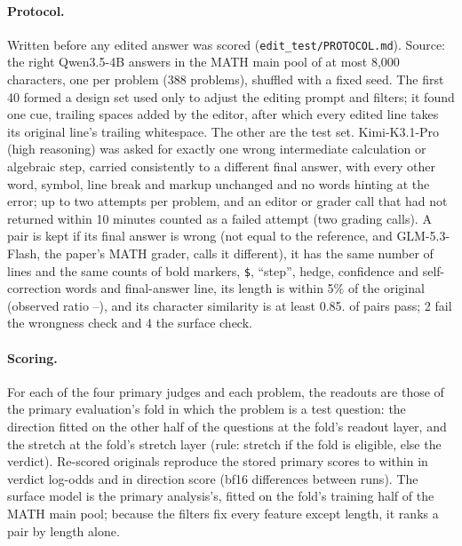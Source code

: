 \paragraph{Protocol.} Written before any edited answer was scored (\texttt{edit\_test/PROTOCOL.md}). Source: the right Qwen3.5-4B answers in the MATH main pool of at most 8,000 characters, one per problem (388 problems), shuffled with a fixed seed. The first 40 formed a design set used only to adjust the editing prompt and filters; it found one cue, trailing spaces added by the editor, after which every edited line takes its original line's trailing whitespace. The other  are the test set. Kimi-K3.1-Pro (high reasoning) was asked for exactly one wrong intermediate calculation or algebraic step, carried consistently to a different final answer, with every other word, symbol, line break and markup unchanged and no words hinting at the error; up to two attempts per problem, and an editor or grader call that had not returned within 10 minutes counted as a failed attempt (two grading calls). A pair is kept if its final answer is wrong (not equal to the reference, and GLM-5.3-Flash, the paper's MATH grader, calls it different), it has the same number of lines and the same counts of bold markers, \texttt{\$}, ``step'', hedge, confidence and self-correction words and final-answer line, its length is within 5\% of the original (observed ratio --), and its character similarity is at least 0.85.  of  pairs pass; 2 fail the wrongness check and 4 the surface check.

\paragraph{Scoring.} For each of the four primary judges and each problem, the readouts are those of the primary evaluation's fold in which the problem is a test question: the direction fitted on the other half of the questions at the fold's readout layer, and the stretch at the fold's stretch layer (rule: stretch if the fold is eligible, else the verdict). Re-scored originals reproduce the stored primary scores to within  in verdict log-odds and  in direction score (bf16 differences between runs). The surface model is the primary analysis's, fitted on the fold's training half of the MATH main pool; because the filters fix every feature except length, it ranks a pair by length alone.

